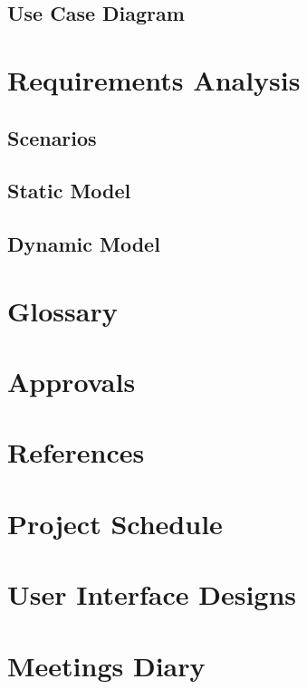 \documentclass[letter,12pt]{report}
\begin{document}
\section{Use Case Diagram}

\chapter{Requirements Analysis}

\section{Scenarios}

\section{Static Model}

\section{Dynamic Model}

\chapter{Glossary}

\chapter{Approvals}

\chapter{References}

\appendix
\chapter{Project Schedule}
\chapter{User Interface Designs}
\chapter{Meetings Diary}
\end{document}
